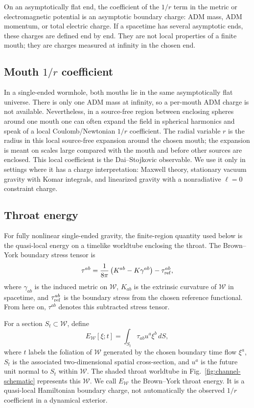 \documentclass[aps,prd,10pt,onecolumn,nofootinbib,superscriptaddress,floatfix]{revtex4-2}
\begin{document}
On an asymptotically flat end, the coefficient of the $1/r$ term in the metric
or electromagnetic potential is an asymptotic boundary charge: ADM mass,
ADM momentum, or total electric charge.  If a spacetime has several
asymptotic ends, these charges are defined end by end.  They are not local
properties of a finite mouth; they are charges measured at infinity in the
chosen end.

\subsection{\texorpdfstring{Mouth $1/r$ coefficient}{Mouth 1/r coefficient}}

In a single-ended wormhole, both mouths lie in the same asymptotically flat
universe.  There is only one ADM mass at infinity, so a per-mouth ADM charge is
not available.  Nevertheless, in a source-free region between enclosing spheres
around one mouth one can often expand the field in spherical harmonics and
speak of a local Coulomb/Newtonian $1/r$ coefficient.  The radial variable $r$
is the radius in this local source-free expansion around the chosen mouth; the
expansion is meant on scales large compared with the mouth and before other
sources are enclosed.  This local coefficient is the Dai--Stojkovic observable.
We use it only in settings where it has a charge interpretation:
Maxwell theory, stationary vacuum gravity with Komar integrals, and linearized
gravity with a nonradiative $\ell=0$ constraint charge.

\subsection{Throat energy}

For fully nonlinear single-ended gravity, the finite-region quantity used below
is the quasi-local energy on a timelike worldtube enclosing the throat.  The
Brown--York boundary stress tensor is
\cite{BrownYork1993Quasilocal,Szabados2009Quasilocal}
\begin{equation}
  \tau^{ab}
  =
  \frac{1}{8\pi}\left(K^{ab}-K\gamma^{ab}\right)
  -\tau_{\rm ref}^{ab},
\end{equation}
where $\gamma_{ab}$ is the induced metric on $\mathcal W$, $K_{ab}$ is the
extrinsic curvature of $\mathcal W$ in spacetime, and $\tau_{\rm ref}^{ab}$ is
the boundary stress from the chosen reference functional.  From here on,
$\tau^{ab}$ denotes this subtracted stress tensor.

For a section $S_t\subset\mathcal W$, define
\begin{equation}
  E_{\mathcal W}[\xi;t]
  =
  \int_{S_t}\tau_{ab}u^a\xi^b\,dS,
\end{equation}
where $t$ labels the foliation of $\mathcal W$ generated by the chosen boundary
time flow $\xi^a$, $S_t$ is the associated two-dimensional spatial
cross-section, and $u^a$ is the future unit normal to $S_t$ within
$\mathcal W$.  The shaded throat worldtube in
Fig.~\ref{fig:channel-schematic} represents this $\mathcal W$.  We call
$E_{\mathcal W}$ the Brown--York throat energy.  It is a quasi-local
Hamiltonian boundary charge, not automatically the observed $1/r$ coefficient
in a dynamical exterior.
\end{document}
